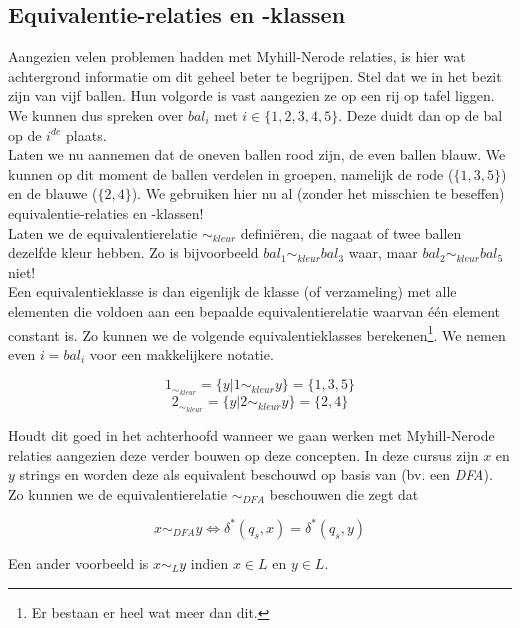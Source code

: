 \documentclass[10pt,a4paper]{article}
\begin{document}
\subsection{Equivalentie-relaties en -klassen}

	Aangezien velen problemen hadden met Myhill-Nerode relaties, is hier wat achtergrond informatie om dit geheel beter te begrijpen. Stel dat we in het bezit zijn van vijf ballen. Hun volgorde is vast aangezien ze op een rij op tafel liggen. We kunnen dus spreken over $bal_i$ met $i \in \{1,2,3,4,5\}$. Deze duidt dan op de bal op de $i^{de}$ plaats.\\

	Laten we nu aannemen dat de oneven ballen rood zijn, de even ballen blauw. We kunnen op dit moment de ballen verdelen in groepen, namelijk de rode ($\{1,3,5\}$) en de blauwe ($\{2,4\}$). We gebruiken hier nu al (zonder het misschien te beseffen) equivalentie-relaties en -klassen!\\

	Laten we de equivalentierelatie $\sim_{kleur}$ defini\"eren, die nagaat of twee ballen dezelfde kleur hebben. Zo is bijvoorbeeld $bal_1 \sim_{kleur} bal_3$ waar, maar $bal_2 \sim_{kleur} bal_5$ niet!\\

	Een equivalentieklasse is dan eigenlijk de klasse (of verzameling) met alle elementen die voldoen aan een bepaalde equivalentierelatie waarvan \'e\'en element constant is. Zo kunnen we de volgende equivalentieklasses berekenen\footnote{Er bestaan er heel wat meer dan dit.}. We nemen even $i = bal_i$ voor een makkelijkere notatie.

	$$1_{\sim_{kleur}} = \{y|1 \sim_{kleur} y\} = \{1,3,5\}$$
	$$2_{\sim_{kleur}} = \{y|2 \sim_{kleur} y\} = \{2,4\}$$

	Houdt dit goed in het achterhoofd wanneer we gaan werken met Myhill-Nerode relaties aangezien deze verder bouwen op deze concepten. In deze cursus zijn $x$ en $y$ strings en worden deze als equivalent beschouwd op basis van (bv. een \emph{DFA}). Zo kunnen we de equivalentierelatie $\sim_{DFA}$ beschouwen die zegt dat

	$$x \sim_{DFA} y \iff \delta^*(q_s,x) = \delta^*(q_s,y)$$

	Een ander voorbeeld is $x \sim_L y$ indien $x \in L$ en $y \in L$.


\newpage











\end{document}
